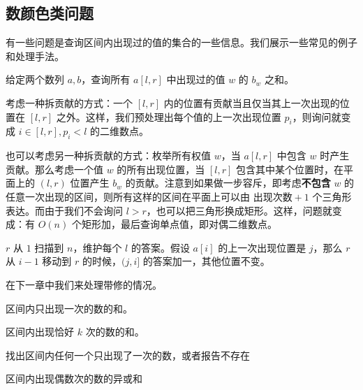 \subsection{数颜色类问题}

有一些问题是查询区间内出现过的值的集合的一些信息。我们展示一些常见的例子和处理手法。

\begin{example}[区间数颜色]
    给定两个数列 $a,b$，查询所有 $a[l,r]$ 中出现过的值 $w$ 的 $b_w$ 之和。
\end{example}
\begin{solution}[做法一]
    考虑一种拆贡献的方式：一个 $[l,r]$ 内的位置有贡献当且仅当其上一次出现的位置在 $[l,r]$ 之外。这样，我们预处理出每个值的上一次出现位置 $p_i$，则询问就变成 $i\in[l,r],p_i<l$ 的二维数点。
\end{solution}
\begin{solution}[做法二]
    也可以考虑另一种拆贡献的方式：枚举所有权值 $w$，当 $a[l,r]$ 中包含 $w$ 时产生贡献。那么考虑一个值 $w$ 的所有出现位置，当 $[l,r]$ 包含其中某个位置时，在平面上的 $(l,r)$ 位置产生 $b_w$ 的贡献。注意到如果做一步容斥，即考虑\textbf{不包含} $w$ 的任意一次出现的区间，则所有这样的区间在平面上可以由 $\text{出现次数}+1$ 个三角形表达。而由于我们不会询问 $l>r$，也可以把三角形换成矩形。这样，问题就变成：有 $O(n)$ 个矩形加，最后查询单点值，即对偶二维数点。
\end{solution}
\begin{solution}[做法三]
    $r$ 从 $1$ 扫描到 $n$，维护每个 $l$ 的答案。假设 $a[i]$ 的上一次出现位置是 $j$，那么 $r$ 从 $i-1$ 移动到 $r$ 的时候，$(j,i]$ 的答案加一，其他位置不变。
\end{solution}
\begin{remark}
    在下一章中我们来处理带修的情况。
\end{remark}

\begin{exercise}
    区间内只出现一次的数的和。
\end{exercise}
\begin{exercise}
    区间内出现恰好 $k$ 次的数的和。
\end{exercise}
\begin{exercise}[CF1000F]
    找出区间内任何一个只出现了一次的数，或者报告不存在
\end{exercise}
\begin{exercise}
    区间内出现偶数次的数的异或和
\end{exercise}






